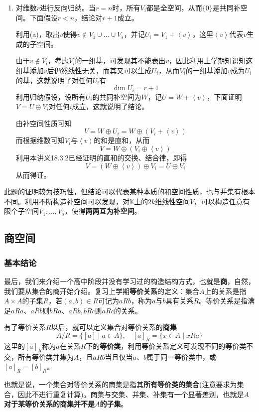 \documentclass[a4paper,UTF8,fontset=windows,AutoFakeBold]{ctexart}
\newcommand*{\note}{\noindent *}
\begin{document}
\begin{enumerate}
\begin{enumerate}
        \item 对维数$r$进行反向归纳。当$r=n$时，所有$V_i$都是全空间，从而$\{0\}$是共同补空间。下面假设$r<n$，结论对$r+1$成立。
        
        利用(a)，取出$v$使得$v\notin V_1\cup\dots\cup V_s$，并记$U_i=V_1+\left<v\right>$，这里$\left<v\right>$代表$v$生成的子空间。

        由于$v\notin V_i$，考虑$V_i$的一组基，可发现其不能表出$v$，因此利用上学期知识知这组基添加$v$后仍然线性无关，而其又可以生成$U_i$，从而$V_i$的一组基添加$v$成为$U_i$的基，这就说明了对任何$U_i$有
        $$\dim U_i=r+1$$
        利用归纳假设，设所有$U_i$的共同补空间为$W$，记$U=W+\left<v\right>$，下面证明$V=U\oplus V_i$对任何$i$成立，这就说明了结论。

        由补空间性质可知
        $$V=W\oplus U_i=W\oplus(V_i+\left<v\right>)$$
        而根据维数可知$V_i$与$\left<v\right>$的和是直和，从而
        $$V=W\oplus(V_i\oplus\left<v\right>)$$
        利用本讲义18.3.2已经证明的直和的交换、结合律，即得
        $$V=(W\oplus\left<v\right>)\oplus V_i=U\oplus V_i$$
        从而得证。
    \end{enumerate}

    \note 此题的证明较为技巧性，但结论可以代表某种本质的和空间性质，也与并集有根本不同。利用不断构造补空间可以发现，对$\mathbb{K}$上的$2k$维线性空间$V$，可以构造任意有限个子空间$V_1,\dots,V_s$，使得\textbf{两两互为补空间}。
\end{enumerate}

\subsection{商空间}
\subsubsection{基本结论}
最后，我们来介绍一个高中阶段并没有学习过的构造结构方式，也就是\textbf{商}，自然，我们要从集合的商开始介绍。复习上学期\textbf{等价关系}的定义：集合$A$上的关系是指$A\times A$的子集$R$，若$(a,b)\in R$可记为$aRb$，称为$a$与$b$具有关系$R$。等价关系是指满足$aRa$、$aRb$则$bRa$、$aRb,bRc$则$aRc$的关系。

有了等价关系$R$以后，就可以定义集合对等价关系的\textbf{商集}
$$A/R=\{[a]\mid a\in A\},\quad [a]_R=\{x\in A\mid xRa\}$$
这里的$[a]_R$称为$a$在关系$R$下的\textbf{等价类}，利用等价关系定义可发现不同的等价类不交，所有等价类并集为$A$，且$aRb$当且仅当$a$、$b$属于同一等价类中，或$[a]_R=[b]_R$。

也就是说，一个集合对等价关系的商集是指其\textbf{所有等价类的集合}(注意要求为集合，因此不进行重复计算)。商集与交集、并集、补集有一个显著差别，也就是\textbf{$A$对于某等价关系的商集并不是$A$的子集}。
\end{document}
